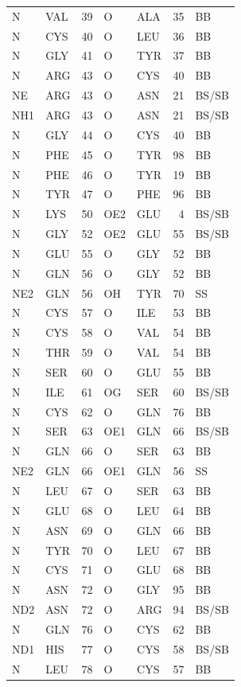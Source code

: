 \documentclass[11pt,twoside,letterpaper]{article}
\begin{document}
\begin{center}
\begin{longtable}{llr>{\hspace{1.2cm}}llr>{\hspace{1.2cm}}l}
		N & VAL & 39 & O & ALA & 35 & BB\\
		N & CYS & 40 & O & LEU & 36 & BB\\
		N & GLY & 41 & O & TYR & 37 & BB\\
		N & ARG & 43 & O & CYS & 40 & BB\\
		NE & ARG & 43 & O & ASN & 21 & BS/SB\\
		NH1 & ARG & 43 & O & ASN & 21 & BS/SB\\
		N & GLY & 44 & O & CYS & 40 & BB\\
		N & PHE & 45 & O & TYR & 98 & BB\\
		N & PHE & 46 & O & TYR & 19 & BB\\
		N & TYR & 47 & O & PHE & 96 & BB\\
		N & LYS & 50 & OE2 & GLU & 4 & BS/SB\\
		N & GLY & 52 & OE2 & GLU & 55 & BS/SB\\
		N & GLU & 55 & O & GLY & 52 & BB\\
		N & GLN & 56 & O & GLY & 52 & BB\\
		NE2 & GLN & 56 & OH & TYR & 70 & SS\\
		N & CYS & 57 & O & ILE & 53 & BB\\
		N & CYS & 58 & O & VAL & 54 & BB\\
		N & THR & 59 & O & VAL & 54 & BB\\
		N & SER & 60 & O & GLU & 55 & BB\\
		N & ILE & 61 & OG & SER & 60 & BS/SB\\
		N & CYS & 62 & O & GLN & 76 & BB\\
		N & SER & 63 & OE1 & GLN & 66 & BS/SB\\
		N & GLN & 66 & O & SER & 63 & BB\\
		NE2 & GLN & 66 & OE1 & GLN & 56 & SS\\
		N & LEU & 67 & O & SER & 63 & BB\\
		N & GLU & 68 & O & LEU & 64 & BB\\
		N & ASN & 69 & O & GLN & 66 & BB\\
		N & TYR & 70 & O & LEU & 67 & BB\\
		N & CYS & 71 & O & GLU & 68 & BB\\
		N & ASN & 72 & O & GLY & 95 & BB\\
		ND2 & ASN & 72 & O & ARG & 94 & BS/SB\\
		N & GLN & 76 & O & CYS & 62 & BB\\
		ND1 & HIS & 77 & O & CYS & 58 & BS/SB\\
		N & LEU & 78 & O & CYS & 57 & BB\\

\end{longtable}
\end{center}
\end{document}
